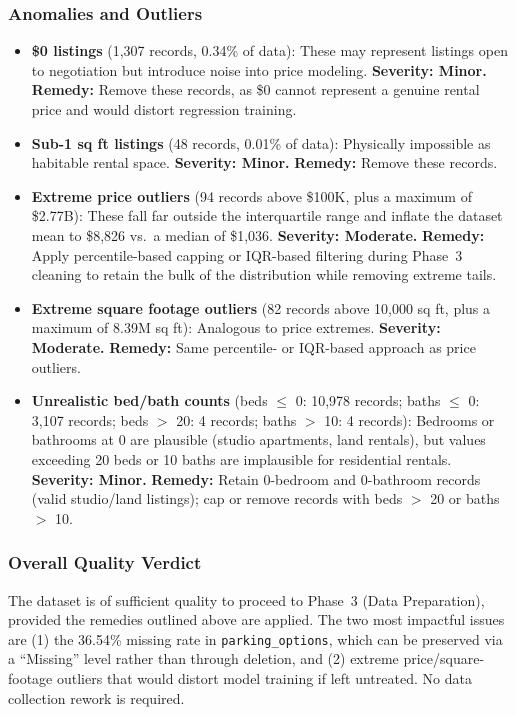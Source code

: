 \subsubsection{Anomalies and Outliers}
\vspace{-12pt}
\begin{itemize}[itemsep = -9pt]
    \item \textbf{\$0 listings} (1,307 records, 0.34\% of data): These may represent listings open to negotiation but introduce noise into price modeling. \textbf{Severity: Minor.} \textbf{Remedy:} Remove these records, as \$0 cannot represent a genuine rental price and would distort regression training.
    \item \textbf{Sub-1 sq ft listings} (48 records, 0.01\% of data): Physically impossible as habitable rental space. \textbf{Severity: Minor.} \textbf{Remedy:} Remove these records.
    \item \textbf{Extreme price outliers} (94 records above \$100K, plus a maximum of \$2.77B): These fall far outside the interquartile range and inflate the dataset mean to \$8,826 vs.\ a median of \$1,036. \textbf{Severity: Moderate.} \textbf{Remedy:} Apply percentile-based capping or IQR-based filtering during Phase~3 cleaning to retain the bulk of the distribution while removing extreme tails.
    \item \textbf{Extreme square footage outliers} (82 records above 10,000 sq ft, plus a maximum of 8.39M sq ft): Analogous to price extremes. \textbf{Severity: Moderate.} \textbf{Remedy:} Same percentile- or IQR-based approach as price outliers.
    \item \textbf{Unrealistic bed/bath counts} (beds $\leq$ 0: 10,978 records; baths $\leq$ 0: 3,107 records; beds $>$ 20: 4 records; baths $>$ 10: 4 records): Bedrooms or bathrooms at 0 are plausible (studio apartments, land rentals), but values exceeding 20 beds or 10 baths are implausible for residential rentals. \textbf{Severity: Minor.} \textbf{Remedy:} Retain 0-bedroom and 0-bathroom records (valid studio/land listings); cap or remove records with beds $>$ 20 or baths $>$ 10.
\end{itemize}

\subsubsection{Overall Quality Verdict}
\noindent
The dataset is of sufficient quality to proceed to Phase~3 (Data Preparation), provided the remedies outlined above are applied. The two most impactful issues are (1) the 36.54\% missing rate in \texttt{parking\_options}, which can be preserved via a ``Missing'' level rather than through deletion, and (2) extreme price/square-footage outliers that would distort model training if left untreated. No data collection rework is required.




